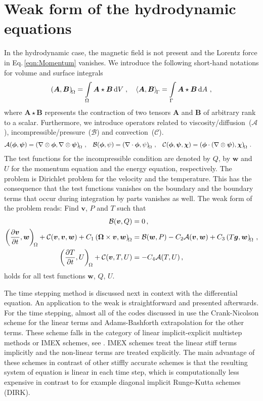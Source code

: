 \section{Weak form of the hydrodynamic equations}
In the hydrodynamic case, the magnetic field is not present and the Lorentz force in Eq.\,\eqref{eqn:Momentum} vanishes. We introduce the following short-hand notations for volume and surface integrals
\begin{equation*}
	\left(\bm A, \bm B\right)_{\!{\Omega}} = \int\limits_{\Omega} \bm A \star \bm B\, \mathrm{d}V \; , \quad
	\left\langle\bm A, \bm B\right\rangle_{\!{\Gamma}}  = \int\limits_{\Gamma} \bm A \star \bm B\, \mathrm{d}A \ ,
\end{equation*}
where $\bm A \star \bm B$ represents the contraction of two tensors $\bm A$ and $\bm B$ of arbitrary rank to a scalar. Furthermore, we introduce operators related to viscosity/diffusion~($\mathcal{A}$), incompressible/pressure~($\mathcal{B}$) and convection~($\mathcal{C}$).
\begin{align*}
\begin{aligned}
	\mathcal{A}(\bm{\phi}, \bm{\psi})&=\left(\nabla\otimes\bm{\phi}, \nabla\otimes\bm{\psi}\right)_{\!{\Omega}}\,, &
	\mathcal{B}(\bm{\phi}, \psi)&=\left(\nabla\cdot\bm{\phi}, \psi\right)_{\!{\Omega}}\,, &
	\mathcal{C}(\bm{\phi}, \bm{\psi}, \bm{\chi})&=\left(\bm{\phi} \cdot (\nabla\otimes\bm{\psi}), \bm{\chi}\right)_{\!{\Omega}}\,.
\end{aligned}
\end{align*}
The test functions for the incompressible condition are denoted by $Q$, by $\bm{w}$ and $U$ for the momentum equation and the energy equation, respectively. The problem is Dirichlet problem for the velocity and the temperature. This has the consequence that the test functions vanishes on the boundary and the boundary terms that occur during integration by parts vanishes as well. The weak form of the problem reads: Find $\bm{v}$, $P$ and $T$ such that
\begin{align}
	\mathcal{B}(\bm{v}, Q)&=0\,, \\
	\left(\frac{\partial \bm{v}}{\partial t}, \bm{w}\right)_{\!{\Omega}}+\mathcal{C}(\bm{v}, \bm{v}, \bm{w})+C_1\left(\bm{\Omega}\times\bm{v}, \bm{w}\right)_{\!{\Omega}}&=\mathcal{B}(\bm{w}, P)-C_2\mathcal{A}(\bm{v}, \bm{w})+C_3\left(T\bm{g}, \bm{w}\right)_{\!{\Omega}}\,,\\
	\left(\frac{\partial T}{\partial t}, U\right)_{\!{\Omega}}+\mathcal{C}(\bm{v}, T, U)&=-C_4\mathcal{A}(T, U)\,,
\end{align}
holds for all test functions $\bm{w}$, $Q$, $U$.

The time stepping method is discussed next in context with the differential equation. An application to the weak is straightforward and presented afterwards. For the time stepping, almost all of the codes discussed in \cite{Matsui2016} use the Crank-Nicolson scheme for the linear terms and Adams-Bashforth extrapolation for the other terms. These scheme falls in the category of linear implicit-explicit multistep methods or IMEX schemes, see \cite{Ascher1995}. IMEX schemes treat the linear stiff terms implicitly and the non-linear terms are treated explicitly. The main advantage of these schemes in contrast of other stiffly accurate schemes is that the resulting system of equation is linear in each time step, which is computationally less expensive in contrast to for example diagonal implicit Runge-Kutta schemes (DIRK). 


